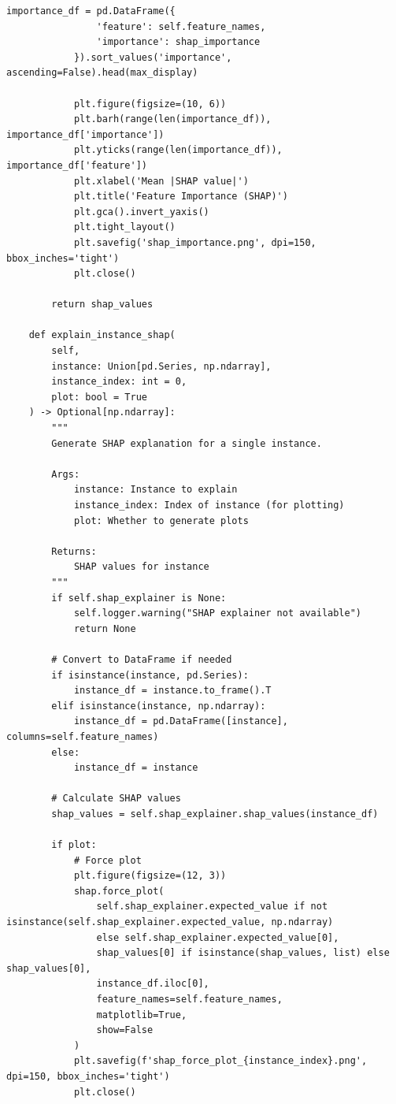 \begin{lstlisting}[style=python, caption={Model Interpretability Framework with SHAP and LIME}]
            importance_df = pd.DataFrame({
                'feature': self.feature_names,
                'importance': shap_importance
            }).sort_values('importance', ascending=False).head(max_display)

            plt.figure(figsize=(10, 6))
            plt.barh(range(len(importance_df)), importance_df['importance'])
            plt.yticks(range(len(importance_df)), importance_df['feature'])
            plt.xlabel('Mean |SHAP value|')
            plt.title('Feature Importance (SHAP)')
            plt.gca().invert_yaxis()
            plt.tight_layout()
            plt.savefig('shap_importance.png', dpi=150, bbox_inches='tight')
            plt.close()

        return shap_values

    def explain_instance_shap(
        self,
        instance: Union[pd.Series, np.ndarray],
        instance_index: int = 0,
        plot: bool = True
    ) -> Optional[np.ndarray]:
        """
        Generate SHAP explanation for a single instance.

        Args:
            instance: Instance to explain
            instance_index: Index of instance (for plotting)
            plot: Whether to generate plots

        Returns:
            SHAP values for instance
        """
        if self.shap_explainer is None:
            self.logger.warning("SHAP explainer not available")
            return None

        # Convert to DataFrame if needed
        if isinstance(instance, pd.Series):
            instance_df = instance.to_frame().T
        elif isinstance(instance, np.ndarray):
            instance_df = pd.DataFrame([instance], columns=self.feature_names)
        else:
            instance_df = instance

        # Calculate SHAP values
        shap_values = self.shap_explainer.shap_values(instance_df)

        if plot:
            # Force plot
            plt.figure(figsize=(12, 3))
            shap.force_plot(
                self.shap_explainer.expected_value if not isinstance(self.shap_explainer.expected_value, np.ndarray)
                else self.shap_explainer.expected_value[0],
                shap_values[0] if isinstance(shap_values, list) else shap_values[0],
                instance_df.iloc[0],
                feature_names=self.feature_names,
                matplotlib=True,
                show=False
            )
            plt.savefig(f'shap_force_plot_{instance_index}.png', dpi=150, bbox_inches='tight')
            plt.close()


\end{lstlisting}
